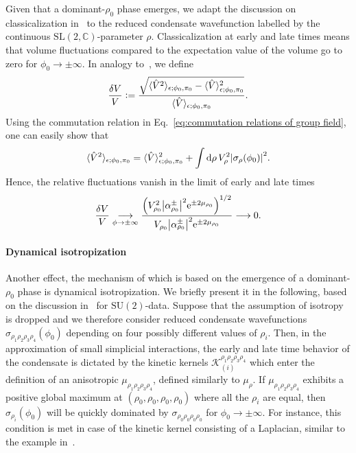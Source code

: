 \documentclass[11pt,a4paper]{article}
\newcommand{\C}{\mathbb C}
\newcommand{\e}{\textrm{e}}
\newcommand{\SU}{\text{SU$(2)$}}
\newcommand{\SL}{\text{SL$(2,\C)$}}
\newcommand{\defeq}{\vcentcolon=}
\begin{document}
Given that a dominant-$\rho_0$ phase emerges, we adapt the discussion on classicalization in~\cite{Pithis:2016cxg} to the reduced condensate wavefunction labelled by the continuous $\SL$-parameter $\rho$. Classicalization at early and late times means that volume fluctuations compared to the expectation value of the volume go to zero for $\phi_0\rightarrow\pm\infty$. In analogy to~\cite{Pithis:2016cxg}, we define
%
\begin{equation}
\frac{\delta V}{V}
\defeq
\frac{\sqrt{\langle\hat{V}^2\rangle_{\epsilon;\phi_0,\pi_0}-\langle\hat{V}\rangle_{\epsilon;\phi_0,\pi_0}^2}}{\langle\hat{V}\rangle_{\epsilon;\phi_0,\pi_0}}.
\end{equation}
%
Using the commutation relation in Eq.~\eqref{eq:commutation relations of group field}, one can easily show that
%
\begin{equation}
\langle\hat{V}^2\rangle_{\epsilon;\phi_0,\pi_0}
=
\langle\hat{V}\rangle_{\epsilon;\phi_0,\pi_0}^2+\int\dd{\rho}V_{\rho}^2\abs{\sigma_{\rho}(\phi_0)}^2.
\end{equation}
%
Hence, the relative fluctuations vanish in the limit of early and late times
%
\begin{equation}
\frac{\delta V}{V}
\underset{\phi\rightarrow\pm\infty}{\longrightarrow}\frac{\left(V_{\rho_0}^2\abs{\alpha_{\rho_0}^{\pm}}^2\e^{\pm 2 \mu_{\rho_0}}\right)^{1/2}}{V_{\rho_0}\abs{\alpha_{\rho_0}^{\pm}}^2\e^{\pm 2 \mu_{\rho_0}}}\longrightarrow 0.
\end{equation}

\paragraph{Dynamical isotropization}

Another effect, the mechanism of which is based on the emergence of a dominant-$\rho_0$ phase is dynamical isotropization. We briefly present it in the following, based on the discussion in~\cite{Pithis:2016cxg} for $\SU$-data. Suppose that the assumption of isotropy is dropped and we therefore consider reduced condensate wavefunctions $\sigma_{\rho_1 \rho_2 \rho_3 \rho_4}(\phi_0)$ depending on four possibly different values of $\rho_i$. Then, in the approximation of small simplicial interactions, the early and late time behavior of the condensate is dictated by the kinetic kernels $\mathscr{K}_{(i)}^{\rho_1 \rho_2 \rho_3 \rho_4}$ which enter the definition of an anisotropic $\mu_{\rho_1 \rho_2 \rho_3 \rho_4}$, defined similarly to $\mu_{\rho}$. If $\mu_{\rho_1 \rho_2 \rho_3 \rho_4}$ exhibits a positive global maximum at $(\rho_0,\rho_0,\rho_0,\rho_0)$ where all the $\rho_i$ are equal, then $\sigma_{\rho_i}(\phi_0)$ will be quickly dominated by $ \sigma_{\rho_0\rho_0 \rho_0 \rho_0}$ for $\phi_0\rightarrow\pm\infty$. For instance, this condition is met in case of the kinetic kernel consisting of a Laplacian, similar to the example in~\cite{Pithis:2016cxg}. 
\end{document}
